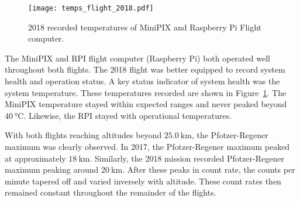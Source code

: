 %
\begin{figure}[H]
\centering
\texttt{[image: temps\_flight\_2018.pdf]}
\caption{2018 recorded temperatures of MiniPIX and Raspberry Pi Flight computer.}
\label{fig:temps_2018}
\end{figure}
%
The MiniPIX and RPI flight computer (Raspberry Pi) both operated well throughout both flights.  The 2018 flight was better equipped to record system health and operation status.  A key status indicator of system health was the system temperature.  These temperatures recorded are shown in Figure~\ref{fig:temps_2018}.  The MiniPIX temperature stayed within expected ranges and never peaked beyond $\SI{40}{\degreeCelsius}$.  Likewise, the RPI stayed with operational temperatures.

With both flights reaching altitudes beyond $\SI{25.0}{\kilo\meter}$, the Pfotzer-Regener maximum was clearly observed.  In 2017, the Pfotzer-Regener maximum peaked at approximately  $\SI{18}{\kilo\meter}$.  Similarly, the 2018 mission recorded Pfotzer-Regener maximum peaking around $\SI{20}{\kilo\meter}$. After these peaks in count rate, the counts per minute tapered off and varied inversely with altitude.  These count rates then remained constant throughout the remainder of the flights.

